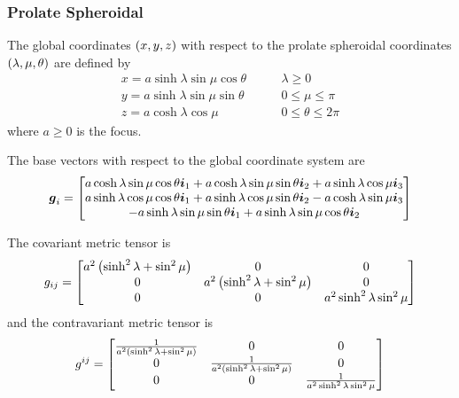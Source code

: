 \subsubsection{Prolate Spheroidal}

The global coordinates $\left( x,y,z \right)$ with respect to the prolate spheroidal
coordinates $\left( \lambda,\mu,\theta \right)$ are defined by
\begin{equation}
  \begin{aligned}
    x = a\sinh\lambda\sin\mu\cos\theta & \qquad \lambda \ge 0 \\
    y = a\sinh\lambda\sin\mu\sin\theta & \qquad 0 \le \mu \le \pi \\
    z = a\cosh\lambda\cos\mu & \qquad 0 \le \theta \le 2\pi 
  \end{aligned}
\end{equation}
where $a\ge0$ is the focus.

The base vectors with respect to the global coordinate system are
\begin{equation}
  \vect{g}_{i}=\begin{bmatrix} 
    a\cosh\lambda\sin\mu\cos\theta\vect{i}_{1}+a\cosh\lambda\sin\mu\sin\theta\vect{i}_{2}+a\sinh\lambda\cos\mu\vect{i}_{3}\\ 
    a\sinh\lambda\cos\mu\cos\theta\vect{i}_{1}+a\sinh\lambda\cos\mu\sin\theta\vect{i}_{2}-a\cosh\lambda\sin\mu\vect{i}_{3}\\
    -a\sinh\lambda\sin\mu\sin\theta\vect{i}_{1}+a\sinh\lambda\sin\mu\cos\theta\vect{i}_{2}
  \end{bmatrix}
\end{equation}

The covariant metric tensor is
\begin{equation}
  g_{ij}=\begin{bmatrix}
    a^{2}\left( \sinh^{2}\lambda+\sin^{2}\mu \right) & 0 & 0 \\
    0 & a^{2}\left( \sinh^{2}\lambda+\sin^{2}\mu \right) & 0 \\
    0 & 0 & a^{2}\sinh^{2}\lambda\sin^{2}\mu 
  \end{bmatrix}
\end{equation}
and the contravariant metric tensor is
\begin{equation}
  g^{ij}=\begin{bmatrix}
    \frac{1}{a^{2}\left( \sinh^{2}\lambda+\sin^{2}\mu \right)}& 0 & 0 \\
    0 & \frac{1}{a^{2}\left( \sinh^{2}\lambda+\sin^{2}\mu \right)} & 0 \\
    0 & 0 & \frac{1}{a^{2}\sinh^{2}\lambda\sin^{2}\mu} 
  \end{bmatrix}
\end{equation}

